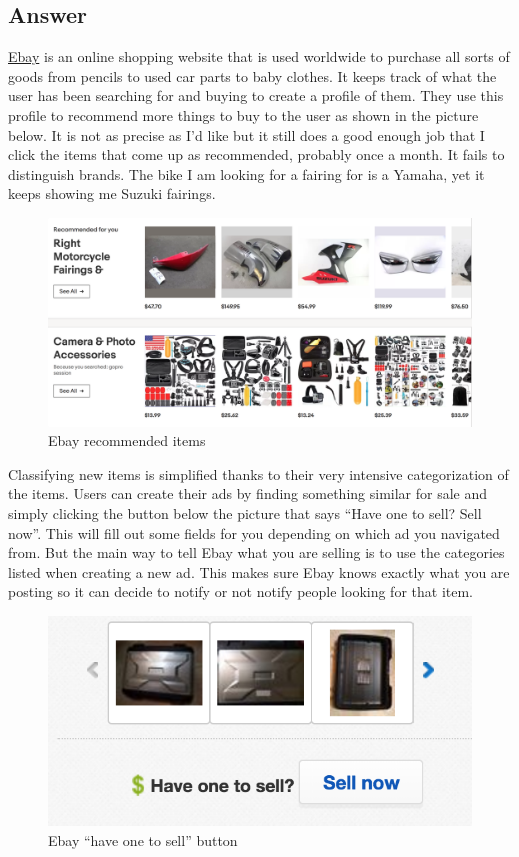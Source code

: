 \documentclass[10pt,letterpaper,bibliography=totoc]{scrartcl}
\begin{document}
\subsection{Answer}
\href{www.ebay.com}{Ebay} is an online shopping website that is used worldwide to purchase all sorts of goods from pencils to used car parts to baby clothes. It keeps track of what the user has been searching for and buying to create a profile of them. They use this profile to recommend more things to buy to the user as shown in the picture below. It is not as precise as I'd like but it still does a good enough job that I click the items that come up as recommended, probably once a month. It fails to distinguish brands. The bike I am looking for a fairing for is a Yamaha, yet it keeps showing me Suzuki fairings. 

\begin{figure}[h!]
\centering
\label{fig:ebay}
\includegraphics[scale=.5]{ebay.png}
\caption{Ebay recommended items}
\end{figure}

Classifying new items is simplified thanks to their very intensive categorization of the items. Users can create their ads by finding something similar for sale and simply clicking the button below the picture that says ``Have one to sell? Sell now''. This will fill out some fields for you depending on which ad you navigated from. But the main way to tell Ebay what you are selling is to use the categories listed when creating a new ad. This makes sure Ebay knows exactly what you are posting so it can decide to notify or not notify people looking for that item.

\begin{figure}[h!]
\centering
\label{fig:ebay-sell}
\includegraphics[scale=.5]{ebay-sell.png}
\caption{Ebay ``have one to sell'' button}
\end{figure}
\end{document}
